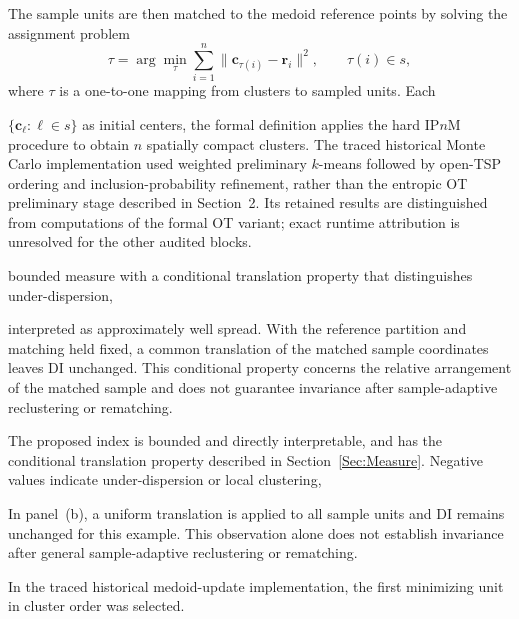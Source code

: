  The sample units are then matched to the medoid reference points by solving the
assignment problem
\[
\tau
=
\arg\min_{\tau}
\sum_{i=1}^n
\|\bm c_{\tau(i)}-\bm r_i\|^2,
\qquad
\tau(i)\in s,
\]
where \(\tau\) is a one-to-one mapping from clusters to sampled units. Each

\(\{\bm c_\ell:\ell\in s\}\) as initial centers, the formal definition applies
the hard IP\(n\)M procedure to obtain \(n\) spatially compact clusters.
The traced historical Monte Carlo implementation used weighted preliminary
\(k\)-means followed by open-TSP ordering and inclusion-probability refinement,
rather than the entropic OT preliminary stage described in Section~2.
Its retained results are distinguished from computations of the formal OT
variant; exact runtime attribution is unresolved for the other audited blocks.

bounded measure with a conditional translation property that distinguishes under-dispersion,

interpreted as approximately well spread. With the reference partition and matching held fixed, a common translation of the matched sample coordinates leaves DI unchanged. This conditional property concerns the relative arrangement of the matched sample and does not guarantee invariance after sample-adaptive reclustering or rematching.

The proposed index is bounded and directly interpretable, and has the conditional translation property described in Section~\ref{Sec:Measure}. Negative values indicate under-dispersion or local clustering,

In panel~(b), a uniform translation is applied to all sample units and DI
remains unchanged for this example. This observation alone does not establish invariance after general sample-adaptive reclustering or rematching.

In the traced historical medoid-update implementation, the first minimizing
unit in cluster order was selected.

